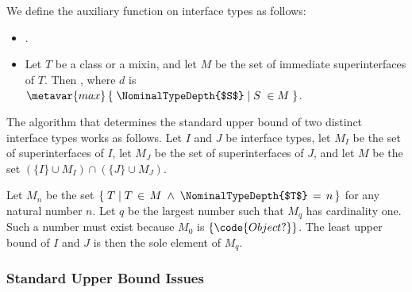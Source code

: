 \documentclass[makeidx]{article}
\begin{document}


\LMHash{}%
We define the auxiliary function \NominalTypeDepthName{}
on interface types as follows:

\begin{itemize}
\item
  .
\item
  Let $T$ be a class or a mixin,
  and let $M$ be the set of immediate superinterfaces of $T$.
  Then ,
  where $d$ is
  $\metavar{max}\,\{\;\NominalTypeDepth{$S$}\;|\;S\;\in M\;\}$.
\end{itemize}

\LMHash{}%
%
The algorithm that determines
the standard upper bound of two distinct interface types
works as follows.
Let $I$ and $J$ be interface types,
let $M_I$ be the set of superinterfaces of $I$,
let $M_J$ be the set of superinterfaces of $J$,
and let $M$ be the set $(\{I\} \cup M_I) \cap (\{J\} \cup M_J)$.

\LMHash{}%
Let $M_n$ be the set
$\{\;T\;|\;T\,\in\,M\;\wedge\;\NominalTypeDepth{$T$}\,=\,n\,\}$
for any natural number $n$.
Let $q$ be the largest number such that $M_q$ has cardinality one.
Such a number must exist because $M_0$ is $\{\code{Object?}\}$.
The least upper bound of $I$ and $J$ is then the sole element of $M_q$.


\subsubsection{Standard Upper Bound Issues}
\end{document}
